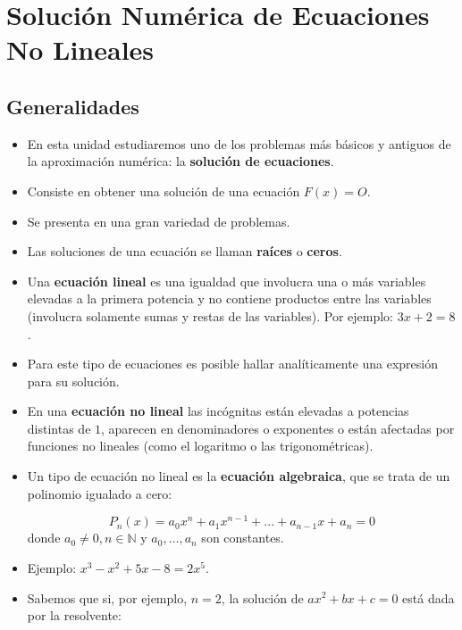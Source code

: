 \documentclass[openany]{book}
\begin{document}
\hypertarget{soluciuxf3n-numuxe9rica-de-ecuaciones-no-lineales}{%
\chapter{Solución Numérica de Ecuaciones No Lineales}\label{soluciuxf3n-numuxe9rica-de-ecuaciones-no-lineales}}

\hypertarget{generalidades}{%
\section{Generalidades}\label{generalidades}}

\begin{itemize}
\item
  En esta unidad estudiaremos uno de los problemas más básicos y antiguos de la aproximación numérica: la \textbf{solución de ecuaciones}.
\item
  Consiste en obtener una solución de una ecuación \(F(x) = O\).
\item
  Se presenta en una gran variedad de problemas.
\item
  Las soluciones de una ecuación se llaman \textbf{raíces} o \textbf{ceros}.
\item
  Una \textbf{ecuación lineal} es una igualdad que involucra una o más variables elevadas a la primera potencia y no contiene productos entre las variables (involucra solamente sumas y restas de las variables). Por ejemplo: \(3x+2 = 8\).
\item
  Para este tipo de ecuaciones es posible hallar analíticamente una expresión para su solución.
\item
  En una \textbf{ecuación no lineal} las incógnitas están elevadas a potencias distintas de \(1\), aparecen en denominadores o exponentes o están afectadas por funciones no lineales (como el logaritmo o las trigonométricas).
\item
  Un tipo de ecuación no lineal es la \textbf{ecuación algebraica}, que se trata de un polinomio igualado a cero:

  \[
    P_n(x) = a_0 x^n + a_1 x^{n-1} + ... + a_{n-1} x + a_n = 0
    \]
  donde \(a_0 \ne 0, n \in \mathbb{N}\) y \(a_0, \dots, a_n\) son constantes.
\item
  Ejemplo: \(x^3 - x^2 + 5x - 8 = 2x^5\).
\item
  Sabemos que si, por ejemplo, \(n = 2\), la solución de \(ax^2 + b x + c = 0\) está dada por la resolvente:
\end{itemize}
\end{document}
